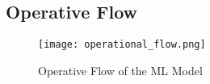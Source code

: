 
\subsection{Operative Flow}

\begin{figure}[t]
	\centering
	\texttt{[image: operational\_flow.png]}
	\caption{Operative Flow of the ML Model}\label{fig:ML_operative_flow}
\end{figure}

